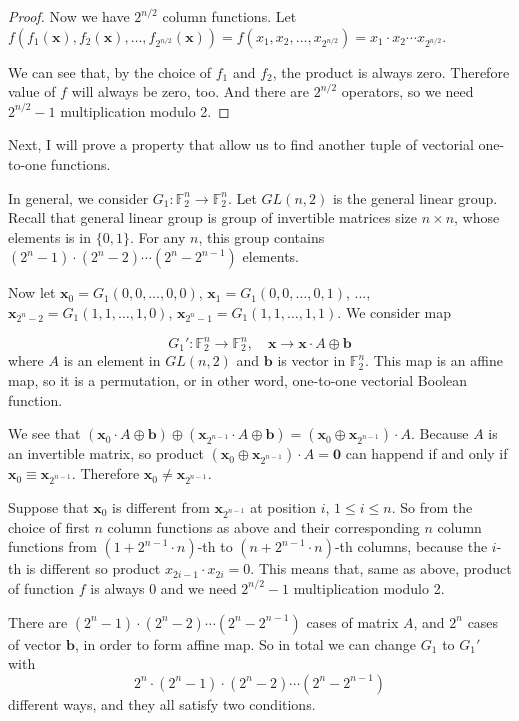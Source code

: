 \documentclass{article}
\newcommand{\FF}{\mathbb{F}}
\begin{document}
\begin{proof}
    Now we have $2^{n/2}$ column functions. Let $f(f_1(\bm{x}), f_2(\bm{x}), \ldots, f_{2^{n/2}}(\bm{x})) = f(x_1, x_2, \ldots, x_{2^{n/2}}) = x_1 \cdot x_2 \cdots x_{2^{n/2}}$.

    We can see that, by the choice of $f_1$ and $f_2$, the product is always zero. Therefore value of $f$ will always be zero, too. And there are $2^{n/2}$ operators, so we need $2^{n/2}-1$ multiplication modulo 2.
\end{proof}

Next, I will prove a property that allow us to find another tuple of vectorial one-to-one functions.

In general, we consider $G_1: \FF_2^n \to \FF_2^n$. Let $GL(n, 2)$ is the general linear group. Recall that general linear group is group of invertible matrices size $n \times n$, whose elements is in $\{ 0, 1 \}$. For any $n$, this group contains $(2^n - 1) \cdot (2^n - 2) \cdots (2^n - 2^{n-1})$ elements.

Now let $\bm{x}_0 = G_1(0, 0, \ldots, 0, 0)$, $\bm{x}_1 = G_1(0, 0, \ldots, 0, 1)$, ..., $\bm{x}_{2^n-2} = G_1(1, 1, \ldots, 1, 0)$, $\bm{x}_{2^n-1} = G_1(1, 1, \ldots, 1, 1)$. We consider map 

\begin{equation}
    G_1': \FF_2^n \to \FF_2^n, \quad \bm{x} \to \bm{x} \cdot A \oplus \bm{b}
\end{equation}
where $A$ is an element in $GL(n, 2)$ and $\bm{b}$ is vector in $\FF_2^n$. This map is an affine map, so it is a permutation, or in other word, one-to-one vectorial Boolean function.

We see that $(\bm{x}_0 \cdot A \oplus \bm{b}) \oplus (\bm{x}_{2^{n-1}} \cdot A \oplus \bm{b}) = (\bm{x}_0 \oplus \bm{x}_{2^{n-1}}) \cdot A$. Because $A$ is an invertible matrix, so product $(\bm{x}_0 \oplus \bm{x}_{2^{n-1}}) \cdot A = \bm{0}$ can happend if and only if $\bm{x}_0 \equiv \bm{x}_{2^{n-1}}$. Therefore $\bm{x}_0 \neq \bm{x}_{2^{n-1}}$.

Suppose that $\bm{x}_0$ is different from $\bm{x}_{2^{n-1}}$ at position $i$, $1 \leqslant i \leqslant n$. So from the choice of first $n$ column functions as above and their corresponding $n$ column functions from $(1+2^{n-1} \cdot n)$-th to $(n+2^{n-1} \cdot n)$-th columns, because the $i$-th is different so product $x_{2i-1} \cdot x_{2i} = 0$. This means that, same as above, product of function $f$ is always 0 and we need $2^{n/2}-1$ multiplication modulo 2.

There are $(2^n - 1) \cdot (2^n - 2) \cdots (2^n - 2^{n-1})$ cases of matrix $A$, and $2^n$ cases of vector $\bm{b}$, in order to form affine map. So in total we can change $G_1$ to $G_1'$ with \[ 2^n \cdot (2^n - 1) \cdot (2^n - 2) \cdots (2^n - 2^{n-1}) \] different ways, and they all satisfy two conditions.
\end{document}
